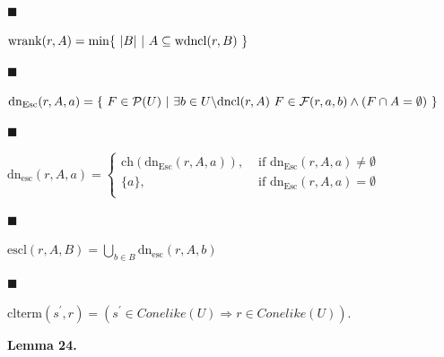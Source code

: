  
\par\noindent  $\blacksquare$ 
 
$\mathrm{wrank}(r,A)=\min\{\leavevmode\nobreak\ |B|\leavevmode\nobreak\ |%
\leavevmode\nobreak\ A\subseteq\mathrm{wdncl}(r,B)\leavevmode\nobreak\ \}$\par
 
 
 
\par\noindent  $\blacksquare$ 
 
$\mathrm{dn_{Esc}}(r,A,a)=\{\leavevmode\nobreak\ F\in\mathcal{P}(U)\leavevmode%
\nobreak\ |\leavevmode\nobreak\ \exists b\in U\backslash\mathrm{dncl}(r,A)%
\leavevmode\nobreak\ F\in\mathcal{F}(r,a,b)\wedge(F\cap A=\emptyset)%
\leavevmode\nobreak\ \}$\par
 
 
 
\par\noindent  $\blacksquare$ 
 
$\mathrm{dn_{esc}}(r,A,a)=\begin{cases}\mathrm{ch}(\mathrm{dn_{Esc}}(r,A,a)),&%
\text{ if }\mathrm{dn_{Esc}}(r,A,a)\neq\emptyset\\
\{a\},&\text{ if }\mathrm{dn_{Esc}}(r,A,a)=\emptyset\\
\end{cases}$\par
 
 
 
\par\noindent  $\blacksquare$ 
 
$\mathrm{escl}(r,A,B)=\bigcup_{b\in B}\mathrm{dn_{esc}}(r,A,b)$\par
 
 
 
\par\noindent  $\blacksquare$ 
 
$\mathrm{clterm}(s^{\prime},r)=(s^{\prime}\in Conelike(U)\Rightarrow r\in
Conelike%
(U))$.\par
 
 
  
 
 
\par\medskip\noindent\textbf{Lemma 24.}\par
 
